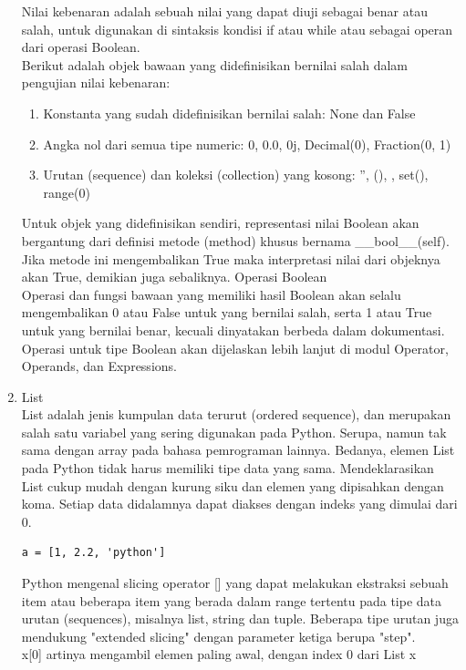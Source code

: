 \begin{enumerate}
Nilai kebenaran adalah sebuah nilai yang dapat diuji sebagai benar atau salah, untuk digunakan di sintaksis kondisi if atau while atau sebagai operan dari operasi Boolean.\\

Berikut adalah objek bawaan yang didefinisikan bernilai salah dalam pengujian nilai kebenaran:
\begin{enumerate}
\item Konstanta yang sudah didefinisikan bernilai salah: None dan False
\item Angka nol dari semua tipe numeric: 0, 0.0, 0j, Decimal(0), Fraction(0, 1)
\item Urutan (sequence) dan koleksi (collection) yang kosong: '', (), {}, set(), range(0)
\end{enumerate}
Untuk objek yang didefinisikan sendiri, representasi nilai Boolean akan bergantung dari definisi metode (method) khusus bernama \_\_bool\_\_(self). Jika metode ini mengembalikan True maka interpretasi nilai dari objeknya akan True, demikian juga sebaliknya.
Operasi Boolean\\
Operasi dan fungsi bawaan yang memiliki hasil Boolean akan selalu mengembalikan 0 atau False untuk yang bernilai salah, serta 1 atau True untuk yang bernilai benar, kecuali dinyatakan berbeda dalam dokumentasi.\\

Operasi untuk tipe Boolean akan dijelaskan lebih lanjut di modul Operator, Operands, dan Expressions.

\item List\\
List adalah jenis kumpulan data terurut (ordered sequence), dan merupakan salah satu variabel yang sering digunakan pada Python. Serupa, namun tak sama dengan array pada bahasa pemrograman lainnya. Bedanya, elemen List pada Python tidak harus memiliki tipe data yang sama. Mendeklarasikan List cukup mudah dengan kurung siku dan elemen yang dipisahkan dengan koma. Setiap data didalamnya dapat diakses dengan indeks yang dimulai dari 0.
\begin{verbatim}
a = [1, 2.2, 'python']
\end{verbatim}
Python mengenal slicing operator [] yang dapat melakukan ekstraksi sebuah item atau beberapa item yang berada dalam range tertentu pada tipe data urutan (sequences), misalnya list, string dan tuple. Beberapa tipe urutan juga mendukung "extended slicing" dengan parameter ketiga berupa "step".\\
x[0] artinya mengambil elemen paling awal, dengan index 0 dari List x\\


\end{enumerate}
